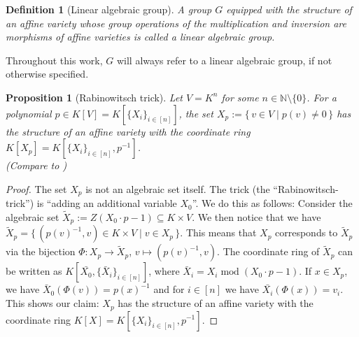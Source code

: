 \message{ !name(roughdraft.tex)}\documentclass[a4paper]{article}
\theoremstyle{prrt}
\newtheorem{definition}[theorem]{Definition}
\newtheorem{proposition}[theorem]{Proposition}
\begin{document}
\begin{definition}[Linear algebraic group]
  A group $G$ equipped with the structure of an affine variety whose group operations of the multiplication and inversion are morphisms of affine varieties is called a \textit{linear algebraic group}.
\end{definition}

Throughout this work, $G$ will always refer to a linear algebraic group, if not otherwise specified.

\begin{proposition}[Rabinowitsch trick]\label{rabbi}
  Let $V = K^n$ for some $n \in \mathbb{N} \setminus \{0\}$.
  For a polynomial $p \in K[V] = K[\{X_i\}_{i\in[n]}]$, the set $ X_p := \{\, v \in V \mid p(v) \neq 0 \,\}$ has the structure of an affine variety with the coordinate ring $K[X_p] = K[\{X_i\}_{i \in [n]}, p^{-1}]$.  \\
  (Compare to \cite{Rab30})
\end{proposition}

\begin{proof}
  The set $X_p$ is not an algebraic set itself.
  The trick (the ``Rabinowitsch-trick'') is ``adding an additional variable $X_0$''.
  We do this as follows:
  Consider the algebraic set $\tilde{X}_p := Z \left( X_0 \cdot p -1 \right) \subseteq K \times V$.
  We then notice that we have $\tilde{X}_p = \{\, (p(v)^{-1},v) \in K \times V \mid v \in X_p \,\}$.
  This means that $X_p$ corresponds to $\tilde{X}_p$ via the bijection $\Phi \colon X_p \rightarrow \tilde{X}_p$, $ v \mapsto (p(v)^{-1},v)$.
  The coordinate ring of $\tilde{X}_p$ can be written as $K[\bar{X_0}, \{\bar{X}_i\}_{i \in [n]}]$, where $\bar{X}_i = X_i \operatorname{mod} (X_0 \cdot p -1)$.
  If $x \in X_p$, we have $\bar{X}_0 (\Phi(v)) = p(x)^{-1}$ and for $ i \in [n] $ we have $\bar{X_i}(\Phi(x)) = v_i$.
  This shows our claim: $X_p$ has the structure of an affine variety with the coordinate ring $K[X] = K[\{X_i\}_{i \in [n]}, p^{-1}]$.
\end{proof}
\end{document}
